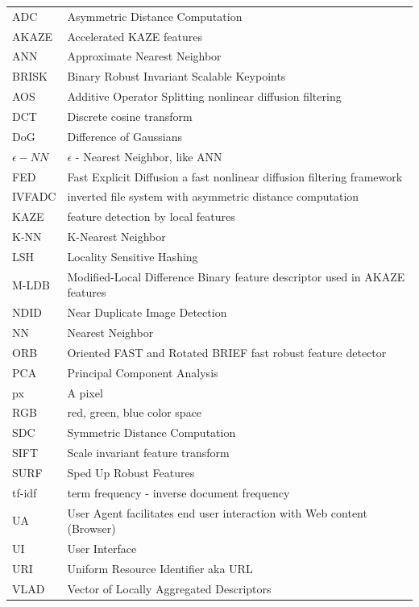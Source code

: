 \documentclass[english,12pt,a4paper,pdftex,elec,utf8]{aaltothesis}
\begin{document}
\begin{tabular}{ll}
  ADC & Asymmetric Distance Computation\\
  AKAZE & Accelerated KAZE features\\
  ANN & Approximate Nearest Neighbor\\
  BRISK & Binary Robust Invariant Scalable Keypoints\\
  AOS & Additive Operator Splitting nonlinear diffusion filtering\\
  DCT & Discrete cosine transform\\
  DoG & Difference of Gaussians\\
  $\epsilon -NN$ & $\epsilon$ - Nearest Neighbor, like ANN\\
  FED & Fast Explicit Diffusion a fast nonlinear diffusion filtering framework\\
  IVFADC & inverted file system with asymmetric distance computation\\
  KAZE & feature detection by local features\\
  K-NN & K-Nearest Neighbor\\
  LSH & Locality Sensitive Hashing\\
  M-LDB & Modified-Local Difference Binary feature descriptor used in AKAZE features\\
  NDID & Near Duplicate Image Detection\\
  NN & Nearest Neighbor\\
  ORB & Oriented FAST and Rotated BRIEF fast robust feature detector\\
  PCA & Principal Component Analysis\\
  px & A pixel  \\
  RGB & red, green, blue color space\\
  SDC & Symmetric Distance Computation\\
  SIFT & Scale invariant feature transform \\
  SURF & Sped Up Robust Features \\
  tf-idf & term frequency - inverse document frequency\\
  UA   & User Agent facilitates end user interaction with Web content (Browser)\\
  UI   & User Interface\\
  URI  & Uniform Resource Identifier aka URL\\
  VLAD & Vector of Locally Aggregated Descriptors\\
\end{tabular}
\end{document}
